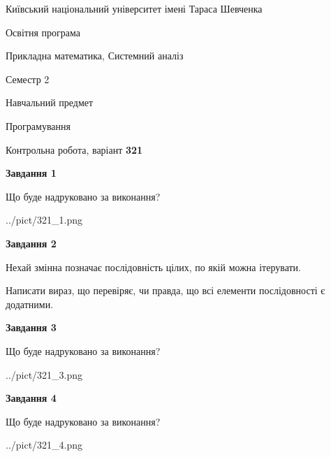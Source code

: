 \documentclass[12pt, ukrainian]{article}
\begin{document}
{{\begin {small}\par
{ \center  Київський національний університет імені Тараса Шевченка \par}
{\parbox {5 cm}{Освітня програма \hfill}{\parbox {8 cm}{Прикладна математика, Системний аналіз \hfill}}\parbox {5 cm}{\hfill Семестр 2}}\par
{\parbox {5 cm} {Навчальний предмет \hfill}\parbox {7 cm}{Програмування \hfill}\parbox {6cm}{\hfill}\par}\vspace{-7pt} \end{small}}{\center Контрольна робота, варіант  \No \textbf
{ 321 }\par}}
{
\begin {large}
{\begin {center}\textbf{Завдання 1}\end {center}}\par
Що буде надруковано за виконання?\par\par
\begin{center}
	{../pict/321_1.png}
\end{center}
\newpage

{\begin {center}\textbf{Завдання 2}\end {center}}\par
Нехай змінна  позначає послідовність цілих, по якій можна ітерувати.

Написати вираз, що перевіряє, чи правда, що всі елементи послідовності є додатни\-ми.\par
\newpage

{\begin {center}\textbf{Завдання 3}\end {center}}\par
Що буде надруковано за виконання?
\begin{center}
	{../pict/321_3.png}
\end{center}
\newpage

{\begin {center}\textbf{Завдання 4}\end {center}}\par
Що буде надруковано за виконання?\par
\begin{center}
	{../pict/321_4.png}
\end{center}
\newpage


\end{large}}
\end{document}
